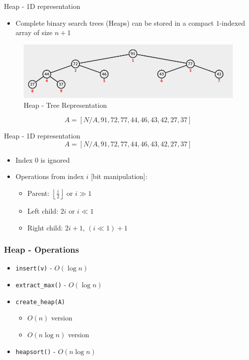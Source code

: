 \documentclass{beamer}
\begin{document}
\begin{frame}{Heap - 1D representation}
    \begin{itemize}
        \item Complete binary search trees (Heaps) can be stored in a compact $1$-indexed array of size $n+1$
    \end{itemize}
    
    \vspace{0.2cm}
    \begin{figure}
        \centering
        \includegraphics[scale=0.3]{imgs/2.3/heap/heap.png}
        \caption{Heap - Tree Representation}
    \end{figure}
    
    \vspace{0.2cm}
    $$A = [N/A, 91, 72, 77, 44, 46, 43, 42, 27, 37]$$
\end{frame}

\begin{frame}{Heap - 1D representation}
    $$A = [N/A, 91, 72, 77, 44, 46, 43, 42, 27, 37]$$
    \begin{itemize}
        \item Index $0$ is ignored
        \item Operations from index $i$ [\color{blue}bit manipulation\color{black}]:
            \begin{itemize}
                \item Parent: $\left\lfloor \frac{i}{2} \right\rfloor$ or \color{blue}$i \gg 1$ \color{black}
                \item Left child: $2i$ or \color{blue}$i \ll 1$ \color{black}
                \item Right child: $2i+1$, \color{blue}$(i \ll 1)+1$ \color{black}
            \end{itemize}
    \end{itemize}
\end{frame}

\begin{frame}[fragile]
\frametitle{Heap - Operations}
	\begin{itemize}
		\item \verb|insert(v)| - \color{blue} $O(\log n)$ \color{black}
		\item \verb|extract_max()| - \color{blue} $O(\log n)$ \color{black}
		\item \verb|create_heap(A)|
			\begin{itemize}
				\item \color{blue} $O(n)$ \color{black} version
				\item \color{blue} $O(n\log n)$ \color{black} version
			\end{itemize}
		\item \verb|heapsort()| - \color{blue} $O(n\log n)$ \color{black}
	\end{itemize}
\end{frame}
\end{document}
